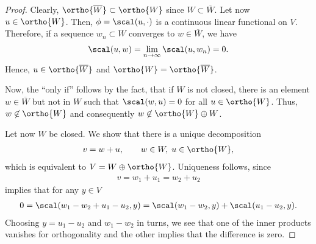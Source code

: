 \begin{proof}
  Clearly, $\ortho{\overline{W}} \subset \ortho{W}$ since
  $W\subset\overline{W}$. Let now $u\in \ortho{W}$. Then, $\phi =
  \scal(u,\cdot)$ is a continuous linear functional on $V$. Therefore,
  if a sequence $w_n \subset W$ converges to $w\in \overline{W}$, we
  have
  \begin{gather}
    \scal(u,w) = \lim_{n\to\infty} \scal(u,w_n) = 0.
  \end{gather}
  Hence, $u\in \ortho{\overline{W}}$ and $\ortho{W} = \ortho{\overline{W}}$.

  Now, the ``only if'' follows by the fact, that if $W$ is not
  closed, there is an element $w\in \overline{W}$ but not in $W$ such that
  $\scal(w,u)=0$ for all $u\in \ortho{W}$. Thus, $w\not\in \ortho{W}$ and
  consequently $w\not\in \ortho{W} \oplus W$.

  Let now $W$ be closed. We show that there is a unique decomposition
  \begin{gather}
    \label{eq:infsup:8}
    v = w + u,\qquad w\in W, \;u\in \ortho{W},
  \end{gather}
  which is equivalent to $V = W \oplus \ortho{W}$. Uniqueness follows,
  since
  \begin{gather}
    v = w_1+u_1 = w_2+u_2
  \end{gather}
  implies that for any $y\in V$
  \begin{gather}
    0 = \scal(w_1-w_2+u_1-u_2,y) = \scal(w_1-w_2,y) + \scal(u_1-u_2,y).
  \end{gather}
  Choosing $y=u_1-u_2$ and $w_1-w_2$ in turns, we see that one of the
  inner products vanishes for orthogonality and the other implies that
  the difference is zero.


\end{proof}
